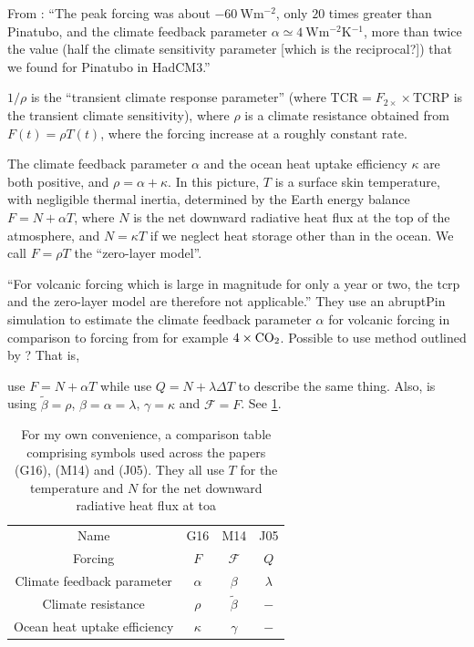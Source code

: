 \documentclass{ametsocV5}
\begin{document}
From \citet{gregory2016}: ``The peak forcing was about \(\SI{-60}{\watt\metre^{-2}}\),
only \(20\) times greater than Pinatubo, and the climate feedback parameter \(\alpha
\simeq \SI{4}{\watt\metre^{-2}\kelvin^{-1}}\), more than twice the value (half the
climate sensitivity parameter [which is the reciprocal?]) that we found for Pinatubo in
HadCM3.''

\(1/\rho \) is the ``transient climate response parameter'' (where
\(\mathrm{TCR}=F_{2\times}\times \mathrm{TCRP}\) is the transient climate sensitivity),
where \(\rho \) is a climate resistance obtained from \(F(t)=\rho T(t)\), where the
forcing increase at a roughly constant rate.

The climate feedback parameter \(\alpha\) and the ocean heat uptake efficiency
\(\kappa\) are both positive, and \(\rho =\alpha +\kappa \). In this picture, \(T\) is a
surface skin temperature, with negligible thermal inertia, determined by the Earth
energy balance \(F=N+\alpha T\), where \(N\) is the net downward radiative heat flux at
the top of the atmosphere, and \(N=\kappa T\) if we neglect heat storage other than in
the ocean. We call \(F=\rho T\) the ``zero-layer model''.

``For volcanic forcing which is large in magnitude for only a year or two, the
\ac{tcrp} and the zero-layer model are therefore not applicable.'' They
\citep{gregory2016} use an abruptPin simulation to estimate the climate feedback
parameter \(\alpha \) for volcanic forcing in comparison to forcing from for example
\(4\times \ce{CO2}\). Possible to use method outlined by \citet{merlis2014}? That is,

\citet{gregory2016} use \(F=N+\alpha T\) while \citet{jones2005} use \(Q=N+\lambda
\Delta T\) to describe the same thing. Also, \citet{merlis2014} is using
\(\tilde{\beta}=\rho\), \(\beta =\alpha =\lambda \), \(\gamma =\kappa \) and
\(\mathcal{F}=F\). See \cref{tab:symbol-comparison}.

\begin{table}
  \centering
  \caption{For my own convenience, a comparison table comprising symbols used across
    the papers \citet{gregory2016} (G16), \citet{merlis2014} (M14) and \citet{jones2005}
    (J05). They all use \(T\) for the temperature and \(N\) for the net downward radiative
    heat flux at \ac{toa}}%
  \label{tab:symbol-comparison}
  \begin{tabular}{cccc}
    Name                         & G16         & M14                & J05          \\
    Forcing                      & \(F\)       & \(\mathcal{F}\)    & \(Q\)        \\
    Climate feedback parameter   & \(\alpha \) & \(\beta \)         & \(\lambda \) \\
    Climate resistance           & \(\rho \)   & \(\tilde{\beta }\) & \(-\)        \\
    Ocean heat uptake efficiency & \(\kappa \) & \(\gamma \)        & \(-\)        \\
  \end{tabular}
\end{table}
\end{document}
